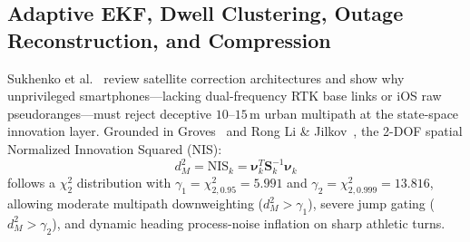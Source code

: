 \begin{table}[htbp]
\centering
\caption{Comparison between Pre-Thesis Confidence-Based Blending and Full Thesis 4-State Kinematic EKF/AEKF.}
\label{tab:kalman_vs_blending}
\end{table}

\subsection{Adaptive EKF, Dwell Clustering, Outage Reconstruction, and Compression}
Sukhenko et al.~\cite{sukhenko2025gnss} review satellite correction architectures and show why unprivileged smartphones---lacking dual-frequency RTK base links or iOS raw pseudoranges---must reject deceptive $10$--$15$\,m urban multipath at the state-space innovation layer. Grounded in Groves~\cite{groves2013principles} and Rong Li \& Jilkov~\cite{rongli2003survey}, the 2-DOF spatial Normalized Innovation Squared (NIS):
\begin{equation}
    d_M^2 = \text{NIS}_k = \boldsymbol{\nu}_k^T \mathbf{S}_k^{-1} \boldsymbol{\nu}_k
    \label{eq:nis_lit}
\end{equation}
follows a $\chi_2^2$ distribution with $\gamma_1 = \chi_{2,0.95}^2 = 5.991$ and $\gamma_2 = \chi_{2,0.999}^2 = 13.816$, allowing moderate multipath downweighting ($d_M^2 > \gamma_1$), severe jump gating ($d_M^2 > \gamma_2$), and dynamic heading process-noise inflation on sharp athletic turns.

